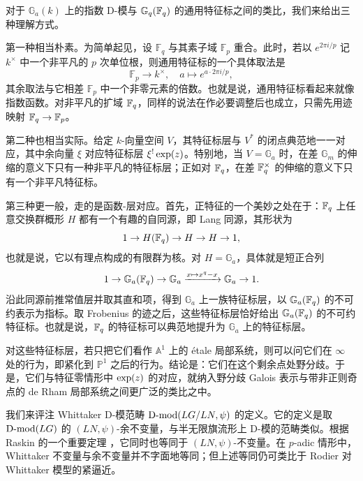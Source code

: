 \begin{re} 对于 $\mathbb{G}_a(k)$ 上的指数 D-模与 $\mathbb{G}_q(\mathbb{F}_q)$ 的通用特征标之间的类比，我们来给出三种理解方式。

第一种相当朴素。为简单起见，设 $\mathbb{F}_q$ 与其素子域 $\mathbb{F}_p$ 重合。此时，若以 $e^{2\pi i / p}$ 记 $k^\times$ 中一个非平凡的 $p$ 次单位根，则通用特征标的一个具体取法是
\[
\mathbb{F}_p \rightarrow k^\times, \quad a \mapsto e^{ a\cdot 2\pi i / p },
\]
其余取法与它相差 $\mathbb{F}_p$ 中一个非零元素的倍数。也就是说，通用特征标看起来就像指数函数。对非平凡的扩域 $\mathbb{F}_q$，同样的说法在作必要调整后也成立，只需先用迹映射 $\mathbb{F}_q \rightarrow \mathbb{F}_p$。

第二种也相当实际。给定 $k$-向量空间 $V$，其特征标层与 $V^*$ 的闭点典范地一一对应，其中余向量 $\xi$ 对应特征标层 $\xi^! \operatorname{exp}(z)$。特别地，当 $V = \mathbb{G}_a$ 时，在差 $\mathbb{G}_m$ 的伸缩的意义下只有一种非平凡的特征标层；正如对 $\mathbb{F}_q$，在差 $\mathbb{F}_q^\times$ 的伸缩的意义下只有一个非平凡特征标。

第三种更一般，走的是函数-层对应。首先，正特征的一个美妙之处在于：$\mathbb{F}_q$ 上任意交换群概形 $H$ 都有一个有趣的自同源，即 Lang 同源，其形状为
\[
1 \rightarrow H(\mathbb{F}_q) \rightarrow H \rightarrow H \rightarrow 1,
\]
也就是说，它以有理点构成的有限群为核。对 $H = \mathbb{G}_a$，具体就是短正合列
\[
1 \rightarrow \mathbb{G}_a(\mathbb{F}_q) \rightarrow \mathbb{G}_a \xrightarrow{x
\mapsto x^q - x} \mathbb{G}_a \rightarrow 1.
\]
沿此同源前推常值层并取其直和项，得到 $\mathbb{G}_a$ 上一族特征标层，以 $\mathbb{G}_a(\mathbb{F}_q)$ 的不可约表示为指标。取 Frobenius 的迹之后，这些特征标层恰好给出 $\mathbb{G}_a(\mathbb{F}_q)$ 的不可约特征标。也就是说，$\mathbb{F}_q$ 的特征标可以典范地提升为 $\mathbb{G}_a$ 上的特征标层。

对这些特征标层，若只把它们看作 $\mathbb{A}^1$ 上的 étale 局部系统，则可以问它们在 $\infty$ 处的行为，即紧化到 $\mathbb{P}^1$ 之后的行为。结论是：它们在这个剩余点处野分歧。于是，它们与特征零情形中 $\operatorname{exp}(z)$ 的对应，就纳入野分歧 Galois 表示与带非正则奇点的 de Rham 局部系统之间更广泛的类比之中。
\end{re}

\begin{re} 我们来评注 Whittaker D-模范畴 $\operatorname{D-mod}(LG / LN, \psi)$ 的定义。它的定义是取 $\operatorname{D-mod}(LG)$ 的 $(LN, \psi)$-余不变量，与半无限旗流形上 D-模的范畴类似。根据 Raskin 的一个重要定理 \cite{whit}，它同时也等同于 $(LN, \psi)$-不变量。在 $p$-adic 情形中，Whittaker 不变量与余不变量并不字面地等同；但上述等同仍可类比于 Rodier \cite{rodier} 对 Whittaker 模型的紧逼近。
\end{re}


